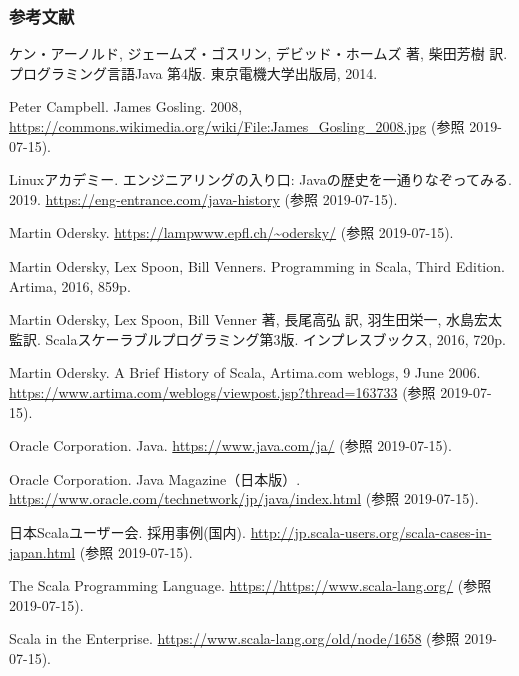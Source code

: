 \documentclass[dvipdfmx]{beamer}
\begin{document}
\begin{frame}[allowframebreaks]
    \frametitle{参考文献}
    \begin{thebibliography}{99}
        ケン・アーノルド, ジェームズ・ゴスリン, デビッド・ホームズ 著, 柴田芳樹 訳. 
        プログラミング言語Java 第4版. 東京電機大学出版局, 2014.

         Peter Campbell. James Gosling. 2008, \url{https://commons.wikimedia.org/wiki/File:James_Gosling_2008.jpg} (参照 2019-07-15).

        Linuxアカデミー. エンジニアリングの入り口: Javaの歴史を一通りなぞってみる. 2019. \url{https://eng-entrance.com/java-history} (参照 2019-07-15).

         Martin Odersky. \url{https://lampwww.epfl.ch/~odersky/} (参照 2019-07-15).

         Martin Odersky, Lex Spoon, Bill Venners. Programming in Scala, Third Edition. Artima, 2016, 859p.

        Martin Odersky, Lex Spoon, Bill Venner 著, 長尾高弘 訳, 羽生田栄一, 水島宏太 監訳. Scalaスケーラブルプログラミング第3版. インプレスブックス, 2016, 720p.

         Martin Odersky. A Brief History of Scala, Artima.com weblogs, 9 June 2006. \url{https://www.artima.com/weblogs/viewpost.jsp?thread=163733} (参照 2019-07-15).

         Oracle Corporation. Java. \url{https://www.java.com/ja/} (参照 2019-07-15).

         Oracle Corporation. Java Magazine（日本版）. \url{https://www.oracle.com/technetwork/jp/java/index.html} (参照 2019-07-15).

         日本Scalaユーザー会. 採用事例(国内). \url{http://jp.scala-users.org/scala-cases-in-japan.html} (参照 2019-07-15).

         The Scala Programming Language. \url{https://https://www.scala-lang.org/} (参照 2019-07-15).

        Scala in the Enterprise. \url{https://www.scala-lang.org/old/node/1658} (参照 2019-07-15).

        
    \end{thebibliography}    
\end{frame}
\end{document}

